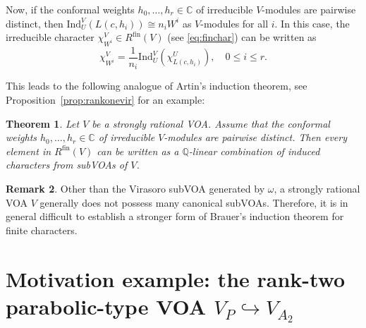 \documentclass[12pt,a4paper,reqno]{amsart}
\numberwithin{equation}{section}
\numberwithin{equation}{section}
\newtheorem{thm}{Theorem}[section]
\theoremstyle{definition}
\newtheorem{example}[thm]{Example}
\newtheorem{remark}[thm]{Remark}
\newcommand{\Z}{\mathbb{Z}}
\newcommand{\Q}{\mathbb{Q}}
\def \C {\mathbb{C}}
\def\la{\lambda}
\def \om{\omega}
\def\hr{\hookrightarrow}
\def\Ind{\mathrm{Ind}}
\def\<{\langle}
\def\>{\rangle}
\def\Ind{\mathrm{Ind}}
\def\fin{\mathrm{fin}}
\begin{document}
	
	Now, if the conformal weights $h_0,\dots,h_r\in \C$ of irreducible $V$-modules are pairwise distinct, then $\Ind^V_U (L(c,h_i))\cong n_i W^i$ as $V$-modules for all $i$. In this case, the irreducible character $\chi^V_{W^i}\in R^{\mathrm{fin}}(V)$ (see \eqref{eq:finchar}) can be written as
	\[
	\chi^V_{W^i}=\frac{1}{n_i}\Ind^V_U(\chi^U_{L(c,h_i)}),\quad 0\leq i\leq r.
	\]
	
	This leads to the following analogue of Artin’s induction theorem, see Proposition~\ref{prop:rankonevir} for an example: 
	
	\begin{thm}\label{thm:Artininduction}
		Let $V$ be a strongly rational VOA. Assume that the conformal weights $h_0,\dots,h_r\in \C$ of irreducible $V$-modules are pairwise distinct. Then every element in $R^{\mathrm{fin}}(V)$ can be written as a $\Q$-linear combination of induced characters from subVOAs of $V$.
	\end{thm}
	
	
	
	
	\begin{remark}
		Other than the Virasoro subVOA generated by $\omega$, a strongly rational VOA $V$ generally does not possess many canonical subVOAs. Therefore, it is in general difficult to establish a stronger form of Brauer’s induction theorem for finite characters.
	\end{remark}
	
	
	
	
	
	
	
	
	
	
	
	
	
	
	
	
	
	
	
	\section{Motivation example: the rank-two parabolic-type VOA $V_P\hr V_{A_2}$}
	\label{sec:6}
	
\end{document}
